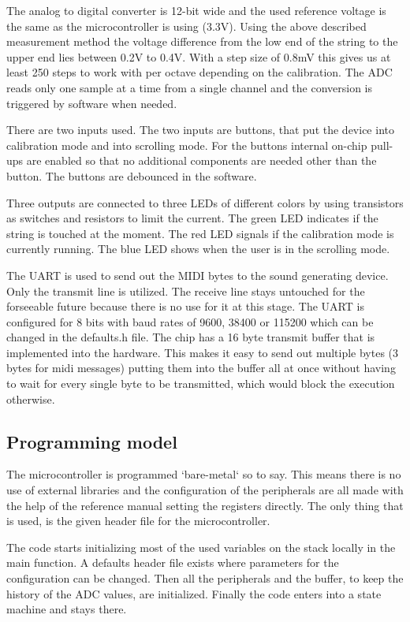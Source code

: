 \documentclass{article}
\begin{document}
The analog to digital converter is 12-bit wide and the used reference voltage is the same as the microcontroller is using (3.3V). Using the above described measurement method the voltage difference from the low end of the string to the upper end lies between 0.2V to 0.4V. With a step size of 0.8mV this gives us at least 250 steps to work with per octave depending on the calibration. The ADC reads only one sample at a time from a single channel and the conversion is triggered by software when needed.

There are two inputs used. The two inputs are buttons, that put the device into calibration mode and into scrolling mode. For the buttons internal on-chip pull-ups are enabled so that no additional components are needed other than the button. The buttons are debounced in the software.

Three outputs are connected to three LEDs of different colors by using transistors as switches and resistors to limit the current. The green LED indicates if the string is touched at the moment. The red LED signals if the calibration mode is currently running. The blue LED shows when the user is in the scrolling mode.

The UART is used to send out the MIDI bytes to the sound generating device. Only the transmit line is utilized. The receive line stays untouched for the forseeable future because there is no use for it at this stage. The UART is configured for 8 bits with baud rates of 9600, 38400 or 115200 which can be changed in the defaults.h file. The chip has a 16 byte transmit buffer that is implemented into the hardware. This makes it easy to send out multiple bytes (3 bytes for midi messages) putting them into the buffer all at once without having to wait for every single byte to be transmitted, which would block the execution otherwise.

\subsection{Programming model}
The microcontroller is programmed `bare-metal` so to say. This means there is no use of external libraries and the configuration of the peripherals are all made with the help of the reference manual setting the registers directly. The only thing that is used, is the given header file for the microcontroller.

The code starts initializing most of the used variables on the stack locally in the main function. A defaults header file exists where parameters for the configuration can be changed. Then all the peripherals and the buffer, to keep the history of the ADC values, are initialized. Finally the code enters into a state machine and stays there.
\end{document}
